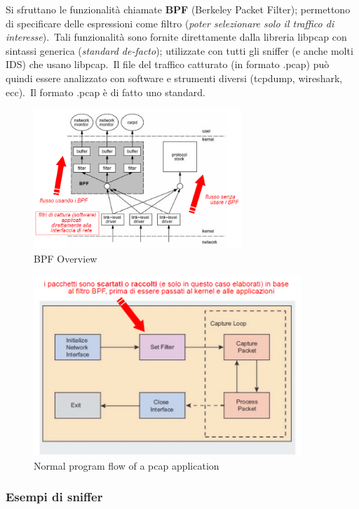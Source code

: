 Si sfruttano le funzionalità chiamate \textbf{BPF} (Berkeley Packet Filter); permettono di specificare delle espressioni come filtro (\emph{poter selezionare solo il traffico di interesse}).\
Tali funzionalità sono fornite direttamente dalla libreria libpcap con sintassi generica (\emph{standard de-facto}); utilizzate con tutti gli sniffer (e anche molti IDS) che usano libpcap.\
Il file del traffico catturato (in formato .pcap) può quindi essere analizzato con software e strumenti diversi (tcpdump, wireshark, ecc).\
Il formato .pcap è di fatto uno standard.

\begin{figure}[H]
    \centering
    \includegraphics[width=0.7\textwidth]{immagini/BPF_overview.png}
    \caption*{BPF Overview}
\end{figure}

\begin{figure}[H]
    \centering
    \includegraphics[width=0.9\textwidth]{immagini/pcap_flow.png}
    \caption*{Normal program flow of a pcap application}
\end{figure}

\subsubsection{Esempi di sniffer}

